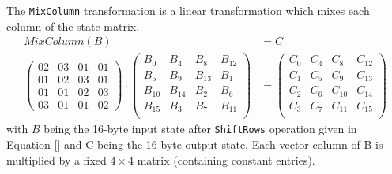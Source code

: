The \texttt{MixColumn} transformation is a linear transformation which mixes each column of the state matrix. 
\begin{align}
    MixColumn(B) &= C\\
    \begin{pmatrix}
        02 & 03 & 01 & 01\\
        01 & 02 & 03 & 01\\
        01 & 01 & 02 & 03\\
        03 & 01 & 01 & 02
    \end{pmatrix}
    \cdot
    \begin{pmatrix}
        B_0 & B_4 & B_8 & B_{12} \\
        B_5 & B_9 & B_{13} & B_1 \\
        B_{10} & B_{14} & B_2 & B_6 \\
        B_{15} & B_3 & B_7 & B_{11} \\
    \end{pmatrix}
    &=
    \begin{pmatrix}
        C_0 & C_4 & C_8 & C_{12} \\
        C_1 & C_5 & C_9 & C_{13} \\
        C_2 & C_6 & C_{10} & C_{14} \\
        C_3 & C_7 & C_{11} & C_{15} \\
    \end{pmatrix}
\end{align}
with $B$ being the 16-byte input state after \texttt{ShiftRows} operation given in Equation \ref{} and C being the 16-byte output state.
Each vector column of B is multiplied by a fixed $4 \times 4$ matrix (containing constant entries).
